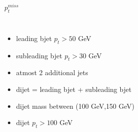 \documentclass[10pt,xcolor=dvipsnames]{beamer}
\begin{document}
\begin{frame}[fragile]{$p^{miss}_t$ }
\begin{columns}
\begin{itemize}
      \item {leading bjet $p_t > 50 $ GeV}
      \item {subleading bjet $p_t > 30 $ GeV}
      \item {atmost 2 additional jets}
      \item {dijet = leading bjet + subleading bjet}
      \item {dijet mass between (100 GeV,150 GeV)}
      \item {dijet $p_t > 100 $ GeV}
    \end{itemize}
  \end{columns}
\end{frame}

\end{document}
